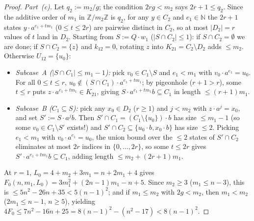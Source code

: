 \documentclass[11pt,a4paper]{article}
\theoremstyle{definition}
\theoremstyle{remark}
\newcommand{\Z}{\mathbb{Z}}
\newcommand{\N}{\mathbb{N}}
\begin{document}
\begin{proof}
\emph{Part~(c).} Let $q_2 := m_2 / g$; the condition $2r g < m_2$ says $2r + 1 \le q_2$. Since the additive order of $m_1$ in $\Z/m_2\Z$ is $q_2$, for any $y \in C_2$ and $e_1 \in \N$ the $2r + 1$ states $y \cdot a^{e_1 + t m_1}$ ($0 \le t \le 2r$) are pairwise distinct in $C_2$, so at most $|D_2| = r$ values of $t$ land in $D_2$. Starting from $S := Q \cdot w_1$ ($|S \cap C_2| \le 1$): if $S \cap C_2 = \emptyset$ we are done; if $S \cap C_2 = \{z\}$ and $k_{12} = 0$, rotating $z$ into $K_{21} = C_2 \setminus D_2$ adds $\le m_2$. Otherwise $U_{12} = \{u_0\}$:
\begin{itemize}[nosep]
  \item \emph{Subcase~A ($|S \cap C_1| \le m_1 - 1$):} pick $v_0 \in C_1 \setminus S$ and $e_1 < m_1$ with $v_0 \cdot a^{e_1} = u_0$. For all $0 \le t \le r$, $u_0 \notin (S \cap C_1) \cdot a^{e_1 + t m_1}$; by pigeonhole ($r + 1 > r$), some $t \le r$ puts $z \cdot a^{e_1 + t m_1} \in K_{21}$, giving $S \cdot a^{e_1 + t m_1} b \subseteq C_1$ in length $\le (r+1)m_1$.
  \item \emph{Subcase~B ($C_1 \subseteq S$):} pick any $x_0 \in D_2$ ($r \ge 1$) and $j < m_2$ with $z \cdot a^j = x_0$, and set $S' := S \cdot a^j b$. Then $S' \cap C_1 = (C_1 \setminus \{u_0\}) \cdot b$ has size $\le m_1 - 1$ (so some $v_0 \in C_1 \setminus S'$ exists!) and $S' \cap C_2 \subseteq \{u_0 \cdot b, x_0 \cdot b\}$ has size $\le 2$. Picking $e_1 < m_1$ with $v_0 \cdot a^{e_1} = u_0$, the union bound over the $\le 2$ states of $S' \cap C_2$ eliminates at most $2r$ indices in $\{0, \dots, 2r\}$, so some $t \le 2r$ gives $S' \cdot a^{e_1 + t m_1} b \subseteq C_1$, adding length $\le m_2 + (2r+1)m_1$.
\end{itemize}
At $r = 1$, $L_0 = 4 + m_2 + 3m_1 = n + 2m_1 + 4$ gives $F_0(n, m_1, L_0) = 3m_1^2 + (2n-1)m_1 - n + 5$. Since $m_2 \ge 3$ ($m_1 \le n - 3$), this is $\le 5n^2 - 26n + 35 < 5(n-1)^2$; and if $m_1 \le m_2$ with $2g < m_2$, then $m_1 < m_2$ ($2m_1 \le n - 1$, $n \ge 5$), yielding $4 F_0 \le 7n^2 - 16n + 25 = 8(n-1)^2 - (n^2 - 17) < 8(n-1)^2$.
\end{proof}
\end{document}
